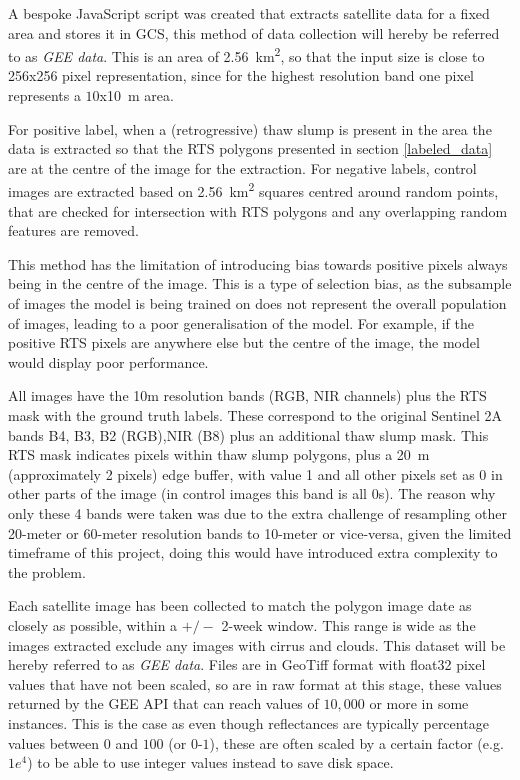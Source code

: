 A bespoke JavaScript script was created that extracts satellite data for a fixed area and stores it in \gls{GCS}, this method of data collection will hereby be referred to as \textit{\gls{GEE} data}. This is an area of \SI{2.56}{\kilo\metre\squared}, so that the input size is close to 256x256 pixel representation, since for the highest resolution band one pixel represents a $10$x\SI{10}{\metre} area.

For positive label, when a (retrogressive) thaw slump is present in the area the data is extracted so that the \gls{RTS} polygons presented in section \ref{labeled_data} are at the centre of the image for the extraction.
For negative labels, control images are extracted based on \SI{2.56}{\kilo\metre\squared} squares centred around random points, that are checked for intersection with \gls{RTS} polygons and any overlapping random features are removed. 

This method has the limitation of introducing bias towards positive pixels always being in the centre of the image. This is a type of selection bias, as the subsample of images the model is being trained on does not represent the overall population of images, leading to a poor generalisation of the model. For example, if the positive \gls{RTS} pixels are anywhere else but the centre of the image, the model would display poor performance.

All images have the 10m resolution bands (\gls{RGB}, \gls{NIR} channels) plus the \gls{RTS} mask with the ground truth labels. These correspond to the original Sentinel 2A bands B4, B3, B2 (\gls{RGB}),\gls{NIR} (B8) plus an additional thaw slump mask. This \gls{RTS} mask indicates pixels within thaw slump polygons, plus a \SI{20}{\metre} (approximately 2 pixels) edge buffer, with value 1 and all other pixels set as 0 in other parts of the image (in control images this band is all 0s). The reason why only these 4 bands were taken was due to the extra challenge of resampling other 20-meter or 60-meter resolution bands to 10-meter or vice-versa, given the limited timeframe of this project, doing this would have introduced extra complexity to the problem.

Each satellite image has been collected to match the polygon image date as closely as possible, within a $+/-$ 2-week window. This range is wide as the images extracted exclude any images with cirrus and clouds. This dataset will be hereby referred to as \textit{\gls{GEE} data}.
Files are in GeoTiff format with float32 pixel values that have not been scaled, so are in raw format at this stage, these values returned by the \gls{GEE} API that can reach values of $10,000$ or more in some instances. This is the case as even though reflectances are typically percentage values between $0$ and $100$ (or $0$-$1$), these are often scaled by a certain factor (e.g. $1 e^4$) to be able to use integer values instead to save disk space. 

